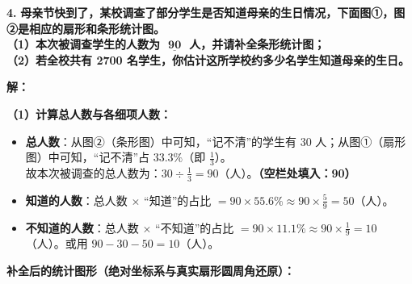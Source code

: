 \documentclass[12pt, a4paper]{ctexrep}
\begin{document}
\vspace{0.6cm}

\textbf{\LARGE 4.} \textbf{母亲节快到了，某校调查了部分学生是否知道母亲的生日情况，下面图①，图②是相应的扇形和条形统计图。\\
（1）本次被调查学生的人数为 $\underline{\textbf{    90    }}$ 人，并请补全条形统计图；\\
（2）若全校共有 2700 名学生，你估计这所学校约多少名学生知道母亲的生日。}

\vspace{0.4cm}
\textbf{解：}

\textbf{（1）计算总人数与各细项人数：}
\begin{itemize}
    \item \textbf{总人数}：从图②（条形图）中可知，“记不清”的学生有 $30$ 人；从图①（扇形图）中可知，“记不清”占 $33.3\%$（即 $\frac{1}{3}$）。\\
    故本次被调查的总人数为：$30 \div \frac{1}{3} = 90$（人）。\textbf{（空栏处填入：90）}
    \item \textbf{知道的人数}：总人数 $\times$ “知道”的占比 $= 90 \times 55.6\% \approx 90 \times \frac{5}{9} = 50$（人）。
    \item \textbf{不知道的人数}：总人数 $\times$ “不知道”的占比 $= 90 \times 11.1\% \approx 90 \times \frac{1}{9} = 10$（人）。或用 $90 - 30 - 50 = 10$（人）。
\end{itemize}

\textbf{补全后的统计图形（绝对坐标系与真实扇形圆周角还原）：}
\end{document}
